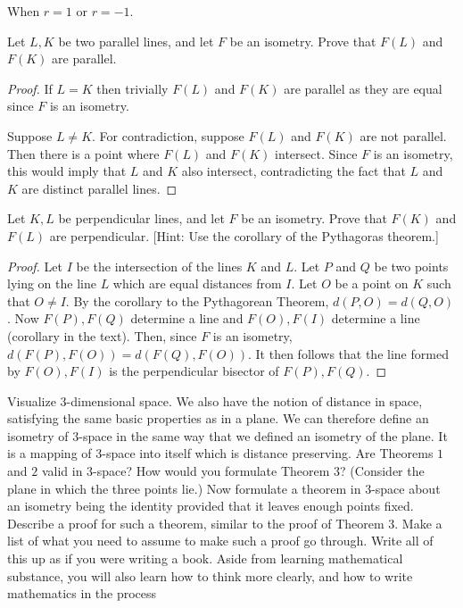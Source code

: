 When $r = 1$ or $r = -1$.

\begin{tcolorbox}[title=Problem 4, breakable]
    Let $L, K$ be two parallel lines, and let $F$ be an isometry.
    Prove that $F(L)$ and $F(K)$ are parallel.
\end{tcolorbox}

\begin{proof}
    If $L = K$ then trivially $F(L)$ and $F(K)$ are parallel as they are equal
        since $F$ is an isometry.

    Suppose $L \not = K$.
    For contradiction, suppose $F(L)$ and $F(K)$ are not parallel.
    Then there is a point where $F(L)$ and $F(K)$ intersect.
    Since $F$ is an isometry, this would imply that $L$ and $K$ also intersect,
        contradicting the fact that $L$ and $K$ are distinct parallel lines.
\end{proof}

\begin{tcolorbox}[title=Problem 5, breakable]
    Let $K, L$ be perpendicular lines, and let $F$ be an isometry.
    Prove that $F(K)$ and $F(L)$ are perpendicular. [Hint: Use the 
    corollary of the Pythagoras theorem.]
\end{tcolorbox}

\begin{proof}
    Let $I$ be the intersection of the lines $K$ and $L$.
    Let $P$ and $Q$ be two points lying on the line $L$ which are equal distances from $I$.
    Let $O$ be a point on $K$ such that $O \ne I$.
    By the corollary to the Pythagorean Theorem, $d(P, O) = d(Q, O)$.
    Now $F(P), F(Q)$ determine a line and $F(O), F(I)$ determine a line (corollary in the text).
    Then, since $F$ is an isometry, $d(F(P), F(O)) = d(F(Q), F(O))$.
    It then follows that the line formed by $F(O), F(I)$ is the perpendicular bisector of $F(P), F(Q)$.
\end{proof}

\begin{tcolorbox}[title=Problem 6, breakable]
    Visualize $3$-dimensional space. We also have the notion of distance in
    space, satisfying the same basic properties as in a plane. We can therefore
    define an isometry of $3$-space in the same way that we defined an isometry
    of the plane. It is a mapping of 3-space into itself which is distance
    preserving. Are Theorems $1$ and $2$ valid in $3$-space? How would you
    formulate Theorem $3$? (Consider the plane in which the three points
    lie.) Now formulate a theorem in 3-space about an isometry being the
    identity provided that it leaves enough points fixed. Describe a proof
    for such a theorem, similar to the proof of Theorem 3. Make a list of
    what you need to assume to make such a proof go through. Write all of
    this up as if you were writing a book. Aside from learning mathematical
    substance, you will also learn how to think more clearly, and how to
    write mathematics in the process
\end{tcolorbox}

